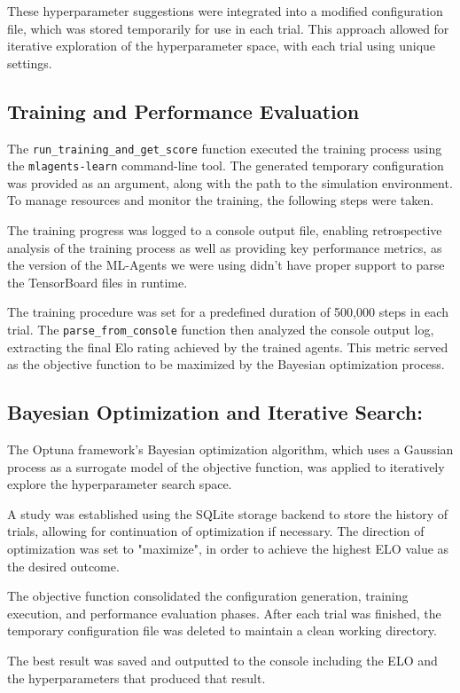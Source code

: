 \documentclass{LSkill}
\begin{document}
These hyperparameter suggestions were integrated into a modified configuration file, which was stored temporarily for use in each trial. This approach allowed for iterative exploration of the hyperparameter space, with each trial using unique settings.
\subsection{Training and Performance Evaluation}

The \texttt{run\_training\_and\_get\_score} function executed the training process using the \texttt{mlagents-learn} command-line tool. The generated temporary configuration was provided as an argument, along with the path to the simulation environment. To manage resources and monitor the training, the following steps were taken.

The training progress was logged to a console output file, enabling retrospective analysis of the training process as well as providing key performance metrics, as the version of the ML-Agents we were using didn’t have proper support to parse the TensorBoard files in runtime.

The training procedure was set for a predefined duration of 500,000 steps in each trial. The \texttt{parse\_from\_console} function then analyzed the console output log, extracting the final Elo rating achieved by the trained agents. This metric served as the objective function to be maximized by the Bayesian optimization process.
\subsection{ Bayesian Optimization and Iterative Search:}
The Optuna framework's Bayesian optimization algorithm, which uses a Gaussian process as a surrogate model of the objective function, was applied to iteratively explore the hyperparameter search space.

A study was established using the SQLite storage backend to store the history of trials, allowing for continuation of optimization if necessary. The direction of optimization was set to "maximize", in order to achieve the highest ELO value as the desired outcome.

The objective function consolidated the configuration generation, training execution, and performance evaluation phases. After each trial was finished, the temporary configuration file was deleted to maintain a clean working directory.

The best result was saved and outputted to the console including the ELO and the hyperparameters that produced that result.
\end{document}
